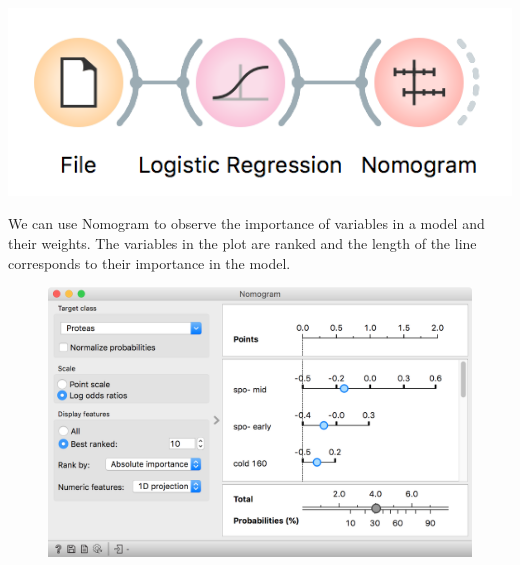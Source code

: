 \begin{marginfigure}
    \includegraphics[width=\linewidth]{workflow2.png}
\end{marginfigure}

We can use Nomogram to observe the importance of variables in a model and their weights. The variables in the plot are ranked and the length of the line corresponds to their importance in the model.

\begin{figure}
    \includegraphics[scale=0.6]{nomogram.png}
    \label{fig:nomogram}
\end{figure}
